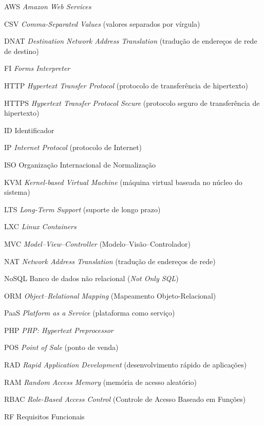 \begin{siglas}
    \item[AWS] \textit{Amazon Web Services}
    \item[CSV] \textit{Comma-Separated Values} (valores separados por vírgula)
    \item[DNAT] \textit{Destination Network Address Translation} (tradução de endereços de rede de destino)
    \item[FI] \textit{Forms Interpreter}
    \item[HTTP] \textit{Hypertext Transfer Protocol} (protocolo de transferência de hipertexto)
    \item[HTTPS] \textit{Hypertext Transfer Protocol Secure} (protocolo seguro de transferência de hipertexto)
    \item[ID] Identificador
    \item[IP] \textit{Internet Protocol} (protocolo de Internet)
    \item[ISO] Organização Internacional de Normalização
    \item[KVM] \textit{Kernel-based Virtual Machine} (máquina virtual baseada no núcleo do sistema)
    \item[LTS] \textit{Long-Term Support} (suporte de longo prazo)
    \item[LXC] \textit{Linux Containers}
    \item[MVC] \textit{Model--View--Controller} (Modelo--Visão--Controlador)
    \item[NAT] \textit{Network Address Translation} (tradução de endereços de rede)
    \item[NoSQL] Banco de dados não relacional (\textit{Not Only SQL})
    \item[ORM] \textit{Object--Relational Mapping} (Mapeamento Objeto-Relacional)
    \item[PaaS] \textit{Platform as a Service} (plataforma como serviço)
    \item[PHP] \textit{PHP: Hypertext Preprocessor}
    \item[POS] \textit{Point of Sale} (ponto de venda)
    \item[RAD] \textit{Rapid Application Development} (desenvolvimento rápido de aplicações)
    \item[RAM] \textit{Random Access Memory} (memória de acesso aleatório)
    \item[RBAC] \textit{Role-Based Access Control} (Controle de Acesso Baseado em Funções)
    \item[RF] Requisitos Funcionais

\end{siglas}
